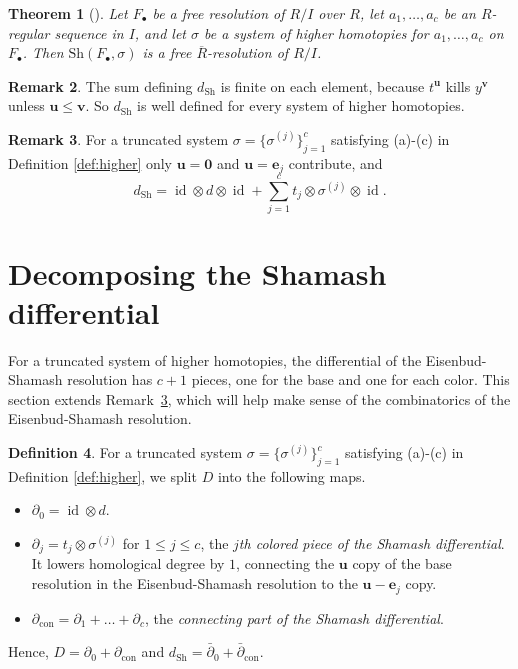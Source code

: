 \documentclass[12pt]{amsart}
\theoremstyle{plain}
\newtheorem{theorem}{Theorem}[section]
\theoremstyle{definition}
\newtheorem{definition}[theorem]{Definition}
\newtheorem{remark}[theorem]{Remark}
\newcommand{\dcon}{\partial_{\mathrm{con}}}
\newcommand{\F}{ {F_\bullet} }
\newcommand{\Rbar}{\overline{R}}
\newcommand{\id}{\operatorname{id}}
\newcommand{\Sh}{\mathrm{Sh}}
\begin{document}
\begin{theorem}[{\cite{Eisenbud1980,EisenbudPeeva,Shamash,Sobieska}}]\label{thm:shamash}
    Let $\F$ be a free resolution of $R/I$ over $R$, let $a_1, \dots, a_c$ be an $R$-regular sequence in $I$, and let $\sigma$ be a system of higher homotopies for $a_1, \dots, a_c$ on $\F$. Then $\Sh(\F, \sigma)$ is a free $\Rbar$-resolution of $R/I$.
\end{theorem}

\begin{remark}\label{rem:shnontrunc}
    The sum defining $d_{\Sh}$ is finite on each element, because $t^{\boldsymbol{u}}$ kills $y^{\boldsymbol{v}}$ unless $\boldsymbol{u} \le \boldsymbol{v}$. So $d_{\Sh}$ is well defined for every system of higher homotopies.
\end{remark}

\begin{remark}\label{rem:shtrunc}
    For a truncated system $\sigma = \{\sigma^{(j)}\}_{j=1}^c$ satisfying (a)-(c) in Definition \ref{def:higher} only $\boldsymbol{u} = \boldsymbol{0}$ and $\boldsymbol{u} = \boldsymbol{e}_j$ contribute, and
    \[
        d_{\Sh} = \id \otimes d \otimes \id + \sum_{j=1}^{c} t_j \otimes \sigma^{(j)} \otimes \id .
    \]
\end{remark}

\section{Decomposing the Shamash differential}\label{sec:decomp}

For a truncated system of higher homotopies, the differential of the Eisenbud-Shamash resolution has $c + 1$ pieces, one for the base and one for each color. This section extends Remark~\ref{rem:shtrunc}, which will help make sense of the combinatorics of the Eisenbud-Shamash resolution.

\begin{definition}
\label{def:delcon}
    For a truncated system $\sigma = \{\sigma^{(j)}\}_{j=1}^c$ satisfying (a)-(c) in Definition \ref{def:higher}, we split $D$ into the following maps.
    \begin{itemize}
        \item $\partial_0 = \id \otimes d$.
        \item $\partial_j = t_j \otimes \sigma^{(j)}$ for $1 \leq j \leq c$, the \emph{$j$th colored piece of the Shamash differential}. It lowers homological degree by $1$, connecting the $\boldsymbol{u}$ copy of the base resolution in the Eisenbud-Shamash resolution to the $\boldsymbol{u}-\boldsymbol{e}_j$ copy.
        \item $\dcon = \partial_1 + \dots + \partial_c$, the \emph{connecting part of the Shamash differential}.
    \end{itemize}
    Hence, $D = \partial_0 + \dcon$ and $d_{\Sh} = \bar\partial_0 + \bar\partial_{\mathrm{con}}$.
\end{definition}
\end{document}
